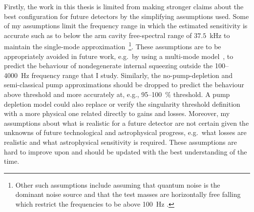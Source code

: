 Firstly, the work in this thesis is limited from making stronger claims about the best configuration for future detectors by the simplifying assumptions used.
Some of my assumptions limit the frequency range in which the estimated sensitivity is accurate such as to below the arm cavity free-spectral range of $37.5$~kHz to maintain the single-mode approximation~\footnote{Other such assumptions include assuming that quantum noise is the dominant noise source and that the test masses are horizontally free falling which restrict the frequencies to be above 100~Hz .}. These assumptions are to be appropriately avoided in future work, e.g.\ by using a multi-mode model~\cite{liEnhancingInterferometerSensitivity2021}, to predict the behaviour of nondegenerate internal squeezing outside the 100--4000~Hz  frequency range that I study.
Similarly, the no-pump-depletion and semi-classical pump approximations should be dropped to predict the behaviour above threshold and more accurately at, e.g., 95--100~$\%$ threshold. A pump depletion model could also replace or verify the singularity threshold definition with a more physical one related directly to gains and losses. 
Moreover, my assumptions about what is realistic for a future detector are not certain given the unknowns of future technological and astrophysical progress, e.g.\ what losses are realistic and what astrophysical sensitivity is required. These assumptions are hard to improve upon and should be updated with the best understanding of the time.
